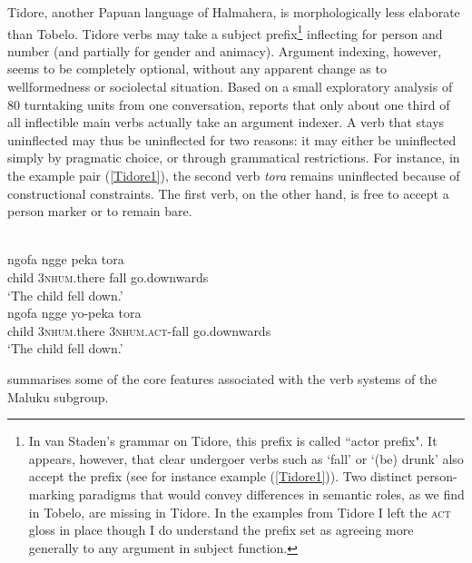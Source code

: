 Tidore, another Papuan language of Halmahera, is morphologically less elaborate than Tobelo. Tidore verbs may take a subject prefix\footnote{In van Staden's grammar on Tidore, this prefix is called ``actor prefix". It appears, however, that clear undergoer verbs such as `fall' or `(be) drunk' also accept the prefix (see for instance example (\ref{Tidore1})). Two distinct person-marking paradigms that would convey differences in semantic roles, as we find in Tobelo, are missing in Tidore. In the examples from Tidore I left the \textsc{act} gloss in place though I do understand the prefix set as agreeing more generally to any argument in subject function.} inflecting for person and number (and partially for gender and animacy). Argument indexing, however, seems to be completely optional, without any apparent change as to wellformedness or sociolectal situation. Based on a small exploratory analysis of 80 turntaking units from one conversation, \citet[79]{vanstaden2000tidore} reports that only about one third of all inflectible main verbs actually take an argument indexer. A verb that stays uninflected may thus be uninflected for two reasons: it may either be uninflected simply by pragmatic choice, or through grammatical restrictions. For instance, in the example pair (\ref{Tidore1}), the second verb \textit{tora} remains uninflected because of constructional constraints. The first verb, on the other hand, is free to accept a person marker or to remain bare.

\ea \label{Tidore1}
\\
\ea
\gll ngofa ngge peka tora \\
child 3\textsc{nhum}.there fall go.downwards \\
\glft `The child fell down.’ \\ 
\ex
\gll ngofa ngge yo-peka tora \\ 
child 3\textsc{nhum}.there 3\textsc{nhum}.\textsc{act}-fall go.downwards \\
\glft `The child fell down.’ \\    
\z
\z

 summarises some of the core features associated with the verb systems of the Maluku subgroup.

\begin{table}[h]
\caption[Basic features of Maluku verb systems]{Overview of basic verbal features of the Maluku languages in the EI data set. Constituent order lists only the basic pattern, pragmatically induced alternative patterns are often also available. Brackets indicate optional use of argument indexers.}
\label{table:overviewmaluku}
\end{table}

